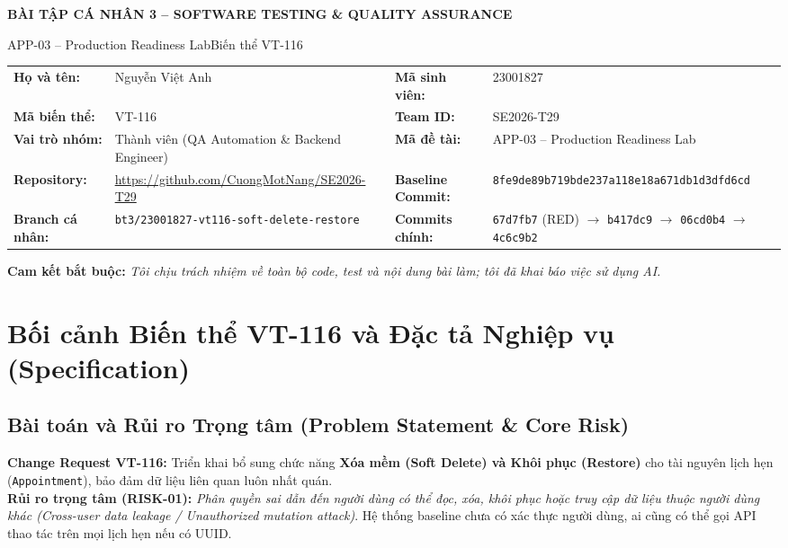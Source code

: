 \documentclass[10pt,a4paper]{article}
\newcommand{\hoten}{Nguyễn Việt Anh}
\newcommand{\mssv}{23001827}
\newcommand{\mabienthe}{VT-116}
\newcommand{\teamid}{SE2026-T29}
\newcommand{\madetai}{APP-03 -- Production Readiness Lab}
\newcommand{\vaitro}{Thành viên (QA Automation \& Backend Engineer)}
\begin{document}
\begin{center}
  {\sffamily\bfseries\large\color{accent} BÀI TẬP CÁ NHÂN 3 -- SOFTWARE TESTING \& QUALITY ASSURANCE\par}
  \vspace{0.5pt}
  {\sffamily\small \madetai \quad\textbullet\quad Biến thể \mabienthe\par}
\end{center}
\vspace{-3pt}

\begin{tcolorbox}[colback=white,colframe=accent!50,boxrule=0.4pt,arc=1.5pt,left=4pt,right=4pt,top=1.5pt,bottom=1.5pt]
\scriptsize
\begin{tabularx}{\linewidth}{@{}P{2.2cm}YP{2.4cm}Y@{}}
\textbf{Họ và tên:} & \hoten & \textbf{Mã sinh viên:} & \mssv\\
\textbf{Mã biến thể:} & \mabienthe & \textbf{Team ID:} & \teamid\\
\textbf{Vai trò nhóm:} & \vaitro & \textbf{Mã đề tài:} & \madetai\\
\textbf{Repository:} & \url{https://github.com/CuongMotNang/SE2026-T29} & \textbf{Baseline Commit:} & \texttt{8fe9de89b719bde237a118e18a671db1d3dfd6cd}\\
\textbf{Branch cá nhân:} & \texttt{bt3/23001827-vt116-soft-delete-restore} & \textbf{Commits chính:} & \texttt{67d7fb7} (RED) $\rightarrow$ \texttt{b417dc9} $\rightarrow$ \texttt{06cd0b4} $\rightarrow$ \texttt{4c6c9b2}\\
\end{tabularx}\par\vspace{0.8pt}
\textbf{Cam kết bắt buộc:} \textit{Tôi chịu trách nhiệm về toàn bộ code, test và nội dung bài làm; tôi đã khai báo việc sử dụng AI.}
\end{tcolorbox}

\section{Bối cảnh Biến thể VT-116 và Đặc tả Nghiệp vụ (Specification)}

\subsection{Bài toán và Rủi ro Trọng tâm (Problem Statement \& Core Risk)}
\textbf{Change Request VT-116:} Triển khai bổ sung chức năng \textbf{Xóa mềm (Soft Delete) và Khôi phục (Restore)} cho tài nguyên lịch hẹn (\texttt{Appointment}), bảo đảm dữ liệu liên quan luôn nhất quán.\\
\textbf{Rủi ro trọng tâm (RISK-01):} \textit{Phân quyền sai dẫn đến người dùng có thể đọc, xóa, khôi phục hoặc truy cập dữ liệu thuộc người dùng khác (Cross-user data leakage / Unauthorized mutation attack)}. Hệ thống baseline chưa có xác thực người dùng, ai cũng có thể gọi API thao tác trên mọi lịch hẹn nếu có UUID.
\end{document}
